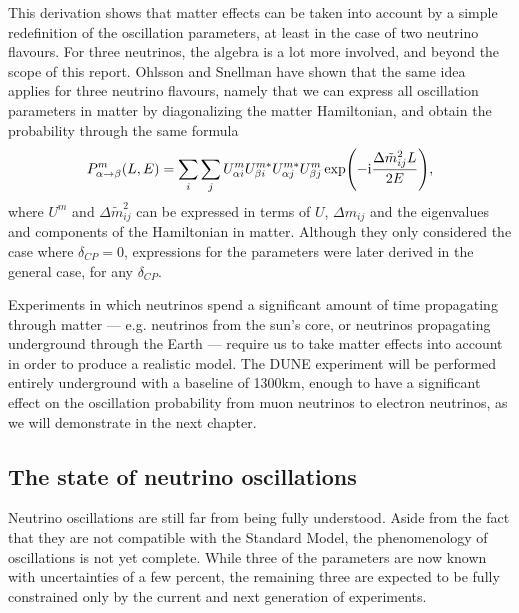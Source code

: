 This derivation shows that matter effects can be taken into account by a simple
redefinition of the oscillation parameters, at least in the case of two
neutrino flavours. For three neutrinos, the algebra is a lot more involved, and
beyond the scope of this report. Ohlsson and Snellman\cite{ohlsson} have
shown that the same idea applies for three neutrino flavours, namely that we can
express all oscillation parameters in matter by diagonalizing the matter
Hamiltonian, and obtain the probability through the same formula
\begin{equation}
	P^m_{\alpha \rightarrow \beta}(L, E) = \sum_i \sum_j U^m_{\alpha i}
	U^{m*}_{\beta i} U^{m*}_{\alpha j} U^m_{\beta j} \exp(-\mathrm{i} \frac{\Delta
	\tilde{m}^2_{ij} L}{2 E}),
\end{equation}
where $U^m$ and $\Delta \tilde{m}^2_{ij}$ can be expressed in terms of $U$,
$\Delta m_{ij}$ and the eigenvalues and components of the Hamiltonian in
matter. Although they only considered the case where $\delta_{CP}=0$,
expressions for the parameters were later derived\cite{kneller} in the general
case, for any $\delta_{CP}$.

Experiments in which neutrinos spend a significant amount of time propagating
through matter --- e.g. neutrinos from the sun's core, or neutrinos propagating
underground through the Earth --- require us to take matter effects into
account in order to produce a realistic model. The DUNE experiment will be
performed entirely underground with a baseline of 1300km, enough to have a
significant effect on the oscillation probability from muon neutrinos to
electron neutrinos, as we will demonstrate in the next chapter. 


\subsection{The state of neutrino oscillations}\label{sec:state}
Neutrino oscillations are still far from being fully understood. Aside from the
fact that they are not compatible with the Standard Model, the phenomenology of
oscillations is not yet complete. While three of the parameters are now known
with uncertainties of a few percent, the remaining three are expected to
be fully constrained only by the current and next generation of experiments.

